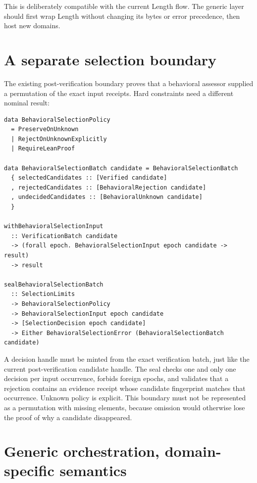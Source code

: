 \documentclass[11pt,oneside]{report}
\begin{document}
This is deliberately compatible with the current Length flow. The generic layer should first wrap Length without changing its bytes or error precedence, then host new domains.

\section{A separate selection boundary}

The existing post-verification boundary proves that a behavioral assessor supplied a permutation of the exact input receipts. Hard constraints need a different nominal result:

\begin{lstlisting}[language=HaskellX,caption={An additive boundary for behaviorally selected candidates.},label={lst:selection-boundary}]
data BehavioralSelectionPolicy
  = PreserveOnUnknown
  | RejectOnUnknownExplicitly
  | RequireLeanProof

data BehavioralSelectionBatch candidate = BehavioralSelectionBatch
  { selectedCandidates :: [Verified candidate]
  , rejectedCandidates :: [BehavioralRejection candidate]
  , undecidedCandidates :: [BehavioralUnknown candidate]
  }

withBehavioralSelectionInput
  :: VerificationBatch candidate
  -> (forall epoch. BehavioralSelectionInput epoch candidate -> result)
  -> result

sealBehavioralSelectionBatch
  :: SelectionLimits
  -> BehavioralSelectionPolicy
  -> BehavioralSelectionInput epoch candidate
  -> [SelectionDecision epoch candidate]
  -> Either BehavioralSelectionError (BehavioralSelectionBatch candidate)
\end{lstlisting}

A decision handle must be minted from the exact verification batch, just like the current post-verification candidate handle. The seal checks one and only one decision per input occurrence, forbids foreign epochs, and validates that a rejection contains an evidence receipt whose candidate fingerprint matches that occurrence. Unknown policy is explicit. This boundary must not be represented as a permutation with missing elements, because omission would otherwise lose the proof of why a candidate disappeared.

\section{Generic orchestration, domain-specific semantics}
\end{document}
